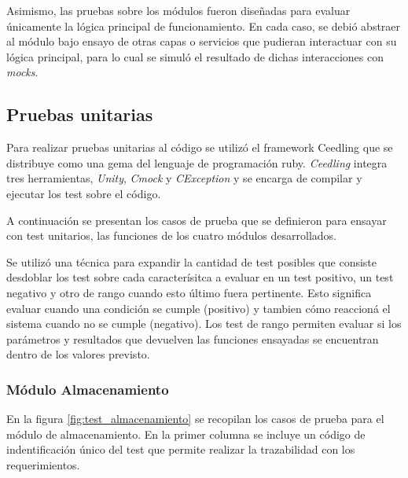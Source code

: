 Asimismo, las pruebas sobre los módulos fueron diseñadas para evaluar únicamente la lógica principal de funcionamiento.  En cada caso, se debió abstraer al módulo bajo ensayo de otras capas o servicios que pudieran interactuar con su lógica principal, para lo cual se simuló el resultado de dichas interacciones con \textit{mocks}. 


\subsection{Pruebas unitarias}
\label{subsec:unitarias}

Para realizar pruebas unitarias al código se utilizó el framework Ceedling \citep{ceedling} que se distribuye como una gema del lenguaje de programación ruby.  \textit{Ceedling} integra tres herramientas, \textit{Unity}, \textit{Cmock} y \textit{CException} y se encarga de compilar y ejecutar los test sobre el código.

A continuación se presentan los casos de prueba que se definieron para ensayar con test unitarios, las funciones de los cuatro módulos desarrollados.  

Se utilizó una técnica para expandir la cantidad de test posibles que consiste desdoblar los test sobre cada caracterísitca a evaluar en un test positivo, un test negativo y otro de rango cuando esto último fuera pertinente.  Esto significa evaluar cuando una condición se cumple (positivo) y tambien cómo reaccioná el sistema cuando no se cumple (negativo).  Los test de rango permiten evaluar si los parámetros y resultados que devuelven las funciones ensayadas se encuentran dentro de los valores previsto.

\subsubsection{Módulo Almacenamiento}

En la figura \ref{fig:test_almacenamiento} se recopilan los casos de prueba para el módulo de almacenamiento.  En la primer columna se incluye un código de indentificación único del test que permite realizar la trazabilidad con los requerimientos.

